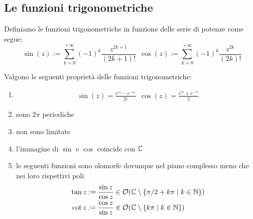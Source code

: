\subsection{\textcolor{AnComp}{\textbf{Le funzioni trigonometriche}}}
	
	\begin{definition}
		\label{defn:sin-cos}
		Definiamo le funzioni trigonometriche in funzione delle serie di potenze come segue:
		\begin{equation*}
			\sin(z) := \sum^{+\infty}_{k=0} (-1)^k\frac{z^{2k+1}}{(2k+1)!} \;\ \cos(z) := \sum^{+\infty}_{k=0} (-1)^k\frac{z^{2k}}{(2k)!}
		\end{equation*}
	\end{definition}
	
	\begin{theorem}
		Valgono le seguenti proprietà delle funzioni trigonometriche:
		\begin{enumerate}
			\item 
			\begin{equation*}
			\begin{aligned}
				\sin(z) = \frac{e^{iz} - e^{-iz}}{2i} \;\ \cos(z) = \frac{e^{iz} + e^{-iz}}{2}
			\end{aligned}
			\end{equation*}
			\item sono $2\pi$ periodiche
			\item non sono limitate
			\item l'immagine di $\sin$ e $\cos$ coincide con $\mathbb{C}$
			\item le seguenti funzioni sono olomorfe dovunque nel piano complesso meno che nei loro rispettivi poli
			\begin{equation*}
			\begin{aligned}
				\tan z & := \frac{\sin z}{\cos z} \in \mathcal{O}(\mathbb{C} \setminus \{ \pi /2 + k\pi \mid k \in \mathbb{N} \}) \\
				\cot z & := \frac{\cos z}{\sin z} \in \mathcal{O}(\mathbb{C} \setminus \{k\pi \mid k \in \mathbb{N} \})
			\end{aligned}
			\end{equation*}
		\end{enumerate}
	\end{theorem}
